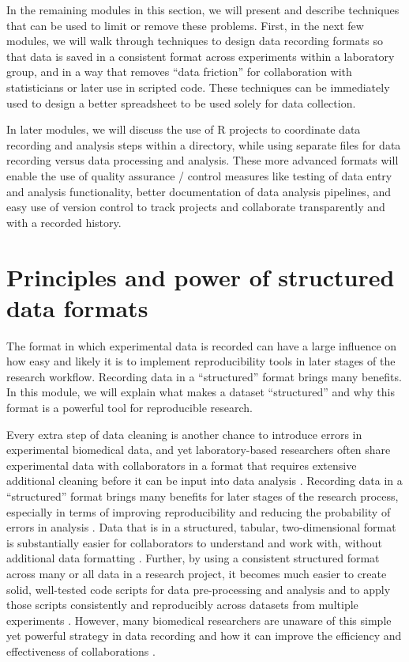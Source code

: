 \documentclass[]{tufte-book}
\begin{document}
In the remaining modules in this section, we will present and describe techniques
that can be used to limit or remove these problems. First, in the next few modules,
we will walk through techniques to design data recording
formats so that data is saved in a consistent format across experiments within
a laboratory group, and in a way that removes ``data friction'' for collaboration
with statisticians or later use in scripted code. These techniques can be immediately
used to design a better spreadsheet to be used solely for data collection.

In later modules, we will discuss the use of R projects to coordinate data
recording and analysis steps within a directory, while using separate files for
data recording versus data processing and analysis. These more advanced formats
will enable the use of quality assurance / control measures like testing of data
entry and analysis functionality, better documentation of data analysis pipelines,
and easy use of version control to track projects and collaborate transparently and
with a recorded history.

\section{Principles and power of structured data formats}\label{module2}

The format in which experimental data is recorded can have a large influence on
how easy and likely it is to implement reproducibility tools in later stages of
the research workflow. Recording data in a ``structured'' format brings many
benefits. In this module, we will explain what makes a dataset ``structured'' and
why this format is a powerful tool for reproducible research.

Every extra step of data cleaning is another chance to introduce errors in
experimental biomedical data, and yet laboratory-based researchers often share
experimental data with collaborators in a format that requires extensive
additional cleaning before it can be input into data analysis
\citep{broman2018data}. Recording data in a ``structured'' format brings many
benefits for later stages of the research process, especially in terms of
improving reproducibility and reducing the probability of errors in analysis
\citep{ellis2018share}. Data that is in a structured, tabular, two-dimensional
format is substantially easier for collaborators to understand and work with,
without additional data formatting \citep{broman2018data}. Further, by using a
consistent structured format across many or all data in a research project, it
becomes much easier to create solid, well-tested code scripts for data
pre-processing and analysis and to apply those scripts consistently and
reproducibly across datasets from multiple experiments \citep{broman2018data}.
However, many biomedical researchers are unaware of this simple yet powerful
strategy in data recording and how it can improve the efficiency and
effectiveness of collaborations \citep{ellis2018share}.
\end{document}
